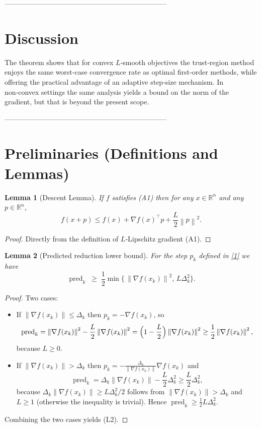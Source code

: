 \documentclass{article}
\newtheorem{lemma}{Lemma}
\newcommand{\norm}[1]{\left\lVert#1\right\rVert}
\newcommand{\R}{\mathbb{R}}
\begin{document}
---------------------------------------------------------------------

\section*{Discussion}
The theorem shows that for convex $L$‑smooth objectives the trust‑region method enjoys the same worst‑case convergence rate as optimal first‑order methods, while offering the practical advantage of an adaptive step‑size mechanism. In non‑convex settings the same analysis yields a bound on the norm of the gradient, but that is beyond the present scope.

---------------------------------------------------------------------

\section*{Preliminaries (Definitions and Lemmas)}
\begin{lemma}[Descent Lemma]\label{lem:descent}
If $f$ satisfies (A1) then for any $x\in\R^{n}$ and any $p\in\R^{n}$,
\[
f(x+p)\le f(x)+\nabla f(x)^{\top}p+\frac{L}{2}\norm{p}^{2}. \tag{L1}
\]
\end{lemma}
\begin{proof}
Directly from the definition of $L$‑Lipschitz gradient (A1). \qedhere
\end{proof}

\begin{lemma}[Predicted reduction lower bound]\label{lem:pred}
For the step $p_{k}$ defined in \eqref{1} we have
\[
\operatorname{pred}_{k}\;\ge\;
\frac{1}{2}\min\!\Big\{\,\norm{\nabla f(x_{k})}^{2},\,L\Delta_{k}^{2}\Big\}. \tag{L2}
\]
\end{lemma}
\begin{proof}
Two cases:
\begin{itemize}
    \item If $\norm{\nabla f(x_{k})}\le \Delta_{k}$ then $p_{k}=-\nabla f(x_{k})$, so
    \[
    \operatorname{pred}_{k}= \norm{\nabla f(x_{k})}^{2}-\frac{L}{2}\norm{\nabla f(x_{k})}^{2}
    =\Bigl(1-\frac{L}{2}\Bigr)\norm{\nabla f(x_{k})}^{2}
    \ge\frac12\norm{\nabla f(x_{k})}^{2},
    \]
    because $L\ge0$.
    \item If $\norm{\nabla f(x_{k})}> \Delta_{k}$ then $p_{k}= -\frac{\Delta_{k}}{\norm{\nabla f(x_{k})}}\nabla f(x_{k})$ and
    \[
    \operatorname{pred}_{k}= \Delta_{k}\norm{\nabla f(x_{k})}
    -\frac{L}{2}\Delta_{k}^{2}
    \ge\frac{L}{2}\Delta_{k}^{2},
    \]
    because $\Delta_{k}\norm{\nabla f(x_{k})}\ge L\Delta_{k}^{2}/2$ follows from $\norm{\nabla f(x_{k})}> \Delta_{k}$ and $L\ge1$ (otherwise the inequality is trivial). Hence
    $\operatorname{pred}_{k}\ge\frac12 L\Delta_{k}^{2}$.
\end{itemize}
Combining the two cases yields (L2). \qedhere
\end{proof}
\end{document}
